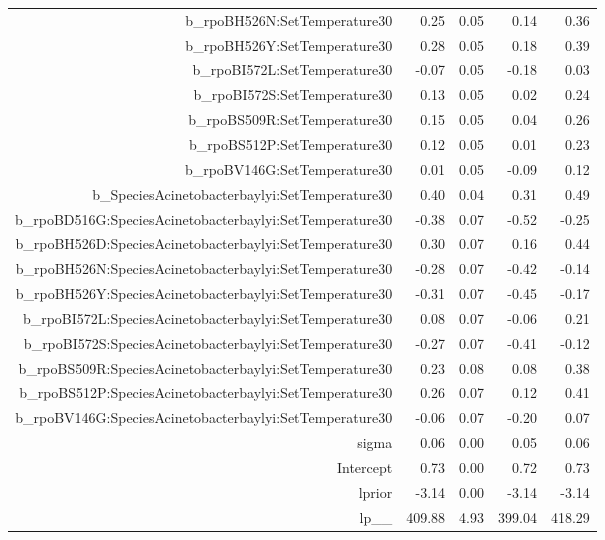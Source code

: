 \begin{table}[ht]
\begin{tabular}{rrrrr}
  b\_rpoBH526N:SetTemperature30 & 0.25 & 0.05 & 0.14 & 0.36 \\ 
  b\_rpoBH526Y:SetTemperature30 & 0.28 & 0.05 & 0.18 & 0.39 \\ 
  b\_rpoBI572L:SetTemperature30 & -0.07 & 0.05 & -0.18 & 0.03 \\ 
  b\_rpoBI572S:SetTemperature30 & 0.13 & 0.05 & 0.02 & 0.24 \\ 
  b\_rpoBS509R:SetTemperature30 & 0.15 & 0.05 & 0.04 & 0.26 \\ 
  b\_rpoBS512P:SetTemperature30 & 0.12 & 0.05 & 0.01 & 0.23 \\ 
  b\_rpoBV146G:SetTemperature30 & 0.01 & 0.05 & -0.09 & 0.12 \\ 
  b\_SpeciesAcinetobacterbaylyi:SetTemperature30 & 0.40 & 0.04 & 0.31 & 0.49 \\ 
  b\_rpoBD516G:SpeciesAcinetobacterbaylyi:SetTemperature30 & -0.38 & 0.07 & -0.52 & -0.25 \\ 
  b\_rpoBH526D:SpeciesAcinetobacterbaylyi:SetTemperature30 & 0.30 & 0.07 & 0.16 & 0.44 \\ 
  b\_rpoBH526N:SpeciesAcinetobacterbaylyi:SetTemperature30 & -0.28 & 0.07 & -0.42 & -0.14 \\ 
  b\_rpoBH526Y:SpeciesAcinetobacterbaylyi:SetTemperature30 & -0.31 & 0.07 & -0.45 & -0.17 \\ 
  b\_rpoBI572L:SpeciesAcinetobacterbaylyi:SetTemperature30 & 0.08 & 0.07 & -0.06 & 0.21 \\ 
  b\_rpoBI572S:SpeciesAcinetobacterbaylyi:SetTemperature30 & -0.27 & 0.07 & -0.41 & -0.12 \\ 
  b\_rpoBS509R:SpeciesAcinetobacterbaylyi:SetTemperature30 & 0.23 & 0.08 & 0.08 & 0.38 \\ 
  b\_rpoBS512P:SpeciesAcinetobacterbaylyi:SetTemperature30 & 0.26 & 0.07 & 0.12 & 0.41 \\ 
  b\_rpoBV146G:SpeciesAcinetobacterbaylyi:SetTemperature30 & -0.06 & 0.07 & -0.20 & 0.07 \\ 
  sigma & 0.06 & 0.00 & 0.05 & 0.06 \\ 
  Intercept & 0.73 & 0.00 & 0.72 & 0.73 \\ 
  lprior & -3.14 & 0.00 & -3.14 & -3.14 \\ 
  lp\_\_ & 409.88 & 4.93 & 399.04 & 418.29 \\ 
   \hline
\end{tabular}
\end{table}
